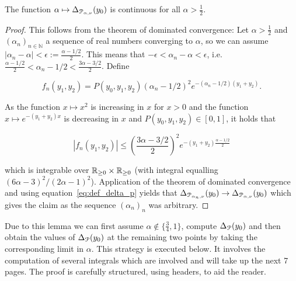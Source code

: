 \begin{lemma}\label{lem:continuity_Delta_function}
The function $\alpha \mapsto \Delta_{{\mathcal P}_{\alpha,\nu}}(y_0)$ is continuous for all $\alpha > \frac{1}{2}$.
\end{lemma}

\begin{proof}
This follows from the theorem of dominated convergence:
Let $\alpha > \frac{1}{2}$ and $(\alpha_n)_{n\in \mathbb{N}}$ a sequence of real numbers converging to $\alpha$, so we can assume $|\alpha_n - \alpha| < \epsilon := \frac{\alpha-1/2}{2}$. This means that $-\epsilon < \alpha_n - \alpha < \epsilon$, i.e. $\frac{\alpha-1/2}{2} < \alpha_n - 1/2 < \frac{3\alpha-3/2}{2}$. Define 

$$f_n(y_1,y_2) = P(y_0,y_1,y_2) (\alpha_n - 1/2)^2 e^{-(\alpha_n-1/2)(y_1+y_2)}.$$ 

As the function $x \mapsto x^2$ is increasing in $x$ for $x>0$ and the function $x \mapsto e^{-(y_1+y_2)x}$ is decreasing in $x$ and $P(y_0,y_1,y_2) \in [0,1]$, it holds that 

$$|f_n(y_1,y_2)| \leq \left(\frac{3\alpha-3/2}{2}\right)^2e^{-(y_1+y_2)\frac{\alpha-1/2}{2}}$$

which is integrable over ${\mathbb R}_{\geq 0} \times {\ensuremath{\mathbb R}}_{\geq 0}$ (with integral equalling $(6\alpha-3)^2/(2\alpha-1)^2$). Application of the theorem of dominated convergence and using equation~\eqref{eq:def_delta_p} yields that $\Delta_{{\mathcal P}_{\alpha_n,\nu}}(y_0) \rightarrow \Delta_{{\mathcal P}_{\alpha,\nu}}(y_0)$ which gives the claim as the sequence $(\alpha_n)_n$ was arbitrary.
\end{proof}

Due to this lemma we can first assume $\alpha \notin \{ \frac{3}{4},1 \}$, compute $\Delta_{{\mathcal P}}(y_0)$ and then obtain the values of $\Delta_{{\mathcal P}}(y_0)$ at the remaining two points by taking the corresponding limit in $\alpha$. This strategy is executed below. It involves the computation of several integrals which are involved and will take up the next 7 pages. The proof is carefully structured, using headers, to aid the reader. 


